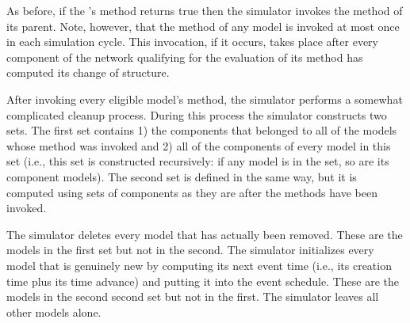 As before, if the 's  method returns true then the simulator invokes the  method of its parent. Note, however, that the  method of any model is invoked at most once in each simulation cycle. This invocation, if it occurs, takes place after every component of the network qualifying for the evaluation of its  method has computed its change of structure.

After invoking every eligible model's  method, the simulator performs a somewhat complicated cleanup process. During this process the simulator constructs two sets. The first set contains 1) the components that belonged to all of the  models whose  method was invoked and 2) all of the components of every model in this set (i.e., this set is constructed recursively: if any model is in the set, so are its component models). The second set is defined in the same way, but it is computed using sets of components as they are after the  methods have been invoked.

The simulator deletes every model that has actually been removed. These are the models in the first set but not in the second. The simulator initializes every model that is genuinely new by computing its next event time (i.e., its creation time plus its time advance) and putting it into the event schedule. These are the models in the second second set but not in the first. The simulator leaves all other models alone.

